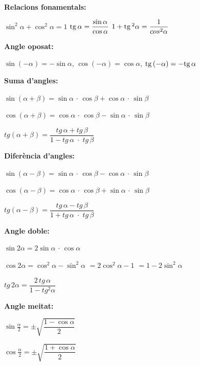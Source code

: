 \label{sec:formularitrig}
\begin{bluebox}
 \textbf{Relacions fonamentals:}
 
\quad [1]\; $\sin^2 \alpha + \cos^2 \alpha = 1$ \qquad     
[2]\; $\mathrm{tg}\, \alpha = \dfrac{\sin \alpha}{\cos \alpha}$ \qquad   
[3]\; $1 + \mathrm{tg}\,^2 \alpha = \dfrac{1}{cos^2 \alpha}$    

 
 \textbf{Angle oposat:}
 
 \quad [4]\; $\sin(-\alpha)=-\sin \alpha$,  \quad$\cos(-\alpha)= \cos \alpha$, \quad $\mathrm{tg}\,(-\alpha)=-\mathrm{tg}\, \alpha$

 \textbf{Suma d'angles:}
 
\quad  [5]\; $     \sin (\alpha+\beta)=\sin \alpha\, \cdot \, \cos \beta+\cos \alpha\, \cdot \, \sin \beta$ 
 
 \quad [6]\; $     \cos (\alpha+\beta)=\cos \alpha\, \cdot \, \cos \beta-\sin \alpha\, \cdot \, \sin \beta$ 
 
 \quad [7]\;$     tg(\alpha+\beta)=\dfrac{tg\, \alpha+tg\, \beta}{1-tg\, \alpha\; \cdot \; tg\, \beta} $ 
 

 
 \textbf{Diferència d'angles:}
 
 \quad [8]\; $  \sin (\alpha-\beta)=\sin \alpha\, \cdot \, \cos \beta-\cos \alpha\, \cdot \, \sin \beta$ 
 
 \quad [9]\;  $ \cos (\alpha-\beta)=\cos \alpha\, \cdot \, \cos \beta+\sin \alpha\, \cdot \, \sin \beta$ 
 
 \quad  [10]\; $ tg(\alpha-\beta)=\dfrac{tg\, \alpha - tg\, \beta}{1+tg\, \alpha\; \cdot \; tg\, \beta} $ 
 \textbf{}
 
  
 \textbf{Angle doble:}
 
 \quad  [11]\; $  \sin 2\alpha=2\sin \alpha\, \cdot \, \cos \alpha$ 
 
 \quad [12]\; $  \cos 2\alpha=\cos ^{2} \alpha-\sin ^{2} \alpha$ 
 $=2\cos^2 \alpha-1$ 
 $=1-2 \sin^2 \alpha$ 
 
 \quad [13]\; $  tg\, 2\alpha=\dfrac{2\, tg\, \alpha}{1-tg^{2} \alpha} $ 
 \textbf{}
 
 
 
 \textbf{Angle meitat:}
 
 \begin{minipage}{0.5\textwidth}
 
 \quad [14]\; $  \sin \frac{\alpha}{2} =\pm \sqrt{\dfrac{1-\cos \alpha}{2} } $ 
 
 \quad [15]\; $  \cos \frac{\alpha}{2} =\pm \sqrt{\dfrac{1+\cos \alpha}{2} } $ 
 

\end{minipage}
\end{bluebox}
